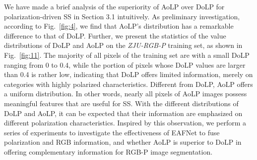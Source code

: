 \documentclass{osa-article}
\begin{document}
We have made a brief analysis of the superiority of AoLP over DoLP for polarization-driven SS in Section 3.1 intuitively. 
As preliminary investigation, according to Fig.~\ref{fig:4}, we find that AoLP's distribution has a remarkable difference to that of DoLP.
Further, we present the statistics of the value distributions of DoLP and AoLP on the \textit{ZJU-RGB-P} training set, as shown in Fig.~\ref{fig:11}. 
The majority of all pixels of the training set are with a small DoLP ranging from 0 to 0.4, while the portion of pixels whose DoLP values are larger than 0.4 is rather low, indicating that DoLP offers limited information, merely on categories with highly polarized characteristics.
Different from DoLP, AoLP offers a uniform distribution.
In other words, nearly all pixels of AoLP images possess meaningful features that are useful for SS.
With the different distributions of DoLP and AoLP, it can be expected that their information are emphasized on different polarization characteristics.
Inspired by this observation, we perform a series of experiments to investigate the effectiveness of EAFNet to fuse polarization and RGB information, and whether AoLP is superior to DoLP in offering complementary information for RGB-P image segmentation.
\end{document}
